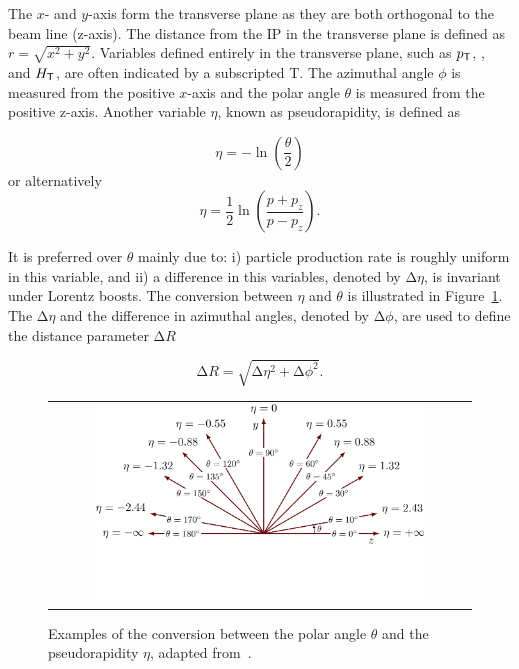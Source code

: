 The $x$- and $y$-axis form the transverse plane as they are both orthogonal to the beam line (z-axis). The distance from the \ac{IP} in the transverse plane is defined as $r=\sqrt{x^2+y^2}$. Variables defined entirely in the transverse plane, such as $p_{\textsf{T}}$, \MET, and $H_{\textsf{T}}$, are often indicated by a subscripted T. The azimuthal angle $\phi$ is measured from the positive $x$-axis and the polar angle $\theta$ is measured from the positive z-axis. Another variable $\eta$, known as pseudorapidity, is defined as

\begin{equation}
\eta=-\ln(\frac{\theta}{2}) 
\end{equation}
or alternatively 
\begin{equation}
\eta=\frac{1}{2}\ln(\frac{p+p_z}{p-p_z}).
\label{eq:eta}
\end{equation}

It is preferred over $\theta$ mainly due to: i) particle production rate is roughly uniform in this variable, and ii) a difference in this variables, denoted by $\mathrm{\Delta}\eta$, is invariant under Lorentz boosts. The conversion between $\eta$ and $\theta$ is illustrated in Figure~\ref{fig:axis2D}. The $\mathrm{\Delta}\eta$ and the difference in azimuthal angles, denoted by $\mathrm{\Delta}\phi$, are used to define the distance parameter $\mathrm{\Delta}R$

\begin{equation}
\label{eq:DR}
\mathrm{\Delta}R=\sqrt{\mathrm{\Delta}\eta^2+\mathrm{\Delta}\phi^2}.
\end{equation}

\begin{figure}[tbh!]
 \begin{center}
 \begin{tabular}{c}
 \includegraphics[width=0.8\textwidth]{figures/Part2/CMS/axis2D_pseudorapidity-003}
 \end{tabular}
 \caption{Examples of the conversion between the polar angle $\theta$ and the pseudorapidity $\eta$, adapted from~\cite{tikz:2D}.}
 \label{fig:axis2D}
 \end{center}
\end{figure}

